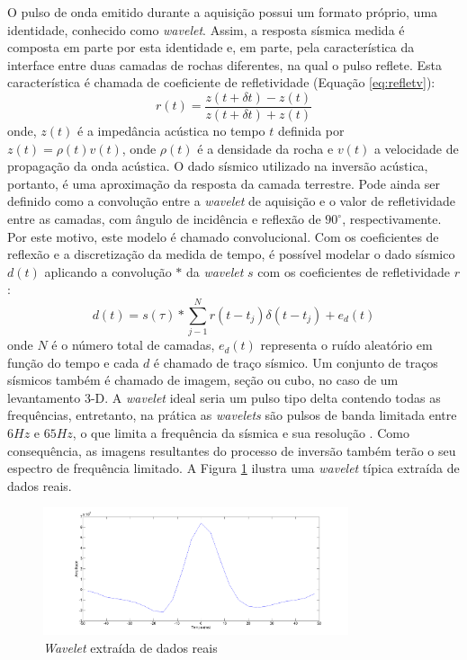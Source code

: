 O pulso de onda emitido durante a aquisição possui um formato próprio, uma identidade, 
conhecido como \textit{wavelet}. Assim, a resposta sísmica medida
é composta em parte por esta identidade e, em parte, pela característica da interface
entre duas camadas de rochas diferentes, na qual o pulso reflete.
Esta característica é chamada de coeficiente de refletividade (Equação \ref{eq:refletv}):
\begin{equation}
r(t) = \frac{z(t+\delta t)-z(t)}{z(t+\delta t)+z(t)}
\label{eq:refletv}
\end{equation}
onde, $z(t)$ é a impedância acústica no tempo $t$ definida por
$z(t)=\rho(t)v(t)$, onde $\rho(t)$ é a densidade da rocha e $v(t)$ a
velocidade de propagação da onda acústica.
O dado sísmico utilizado na inversão acústica, portanto,
é uma aproximação da resposta da camada terrestre. Pode ainda ser definido como
a convolução entre a \textit{wavelet} de aquisição e o valor de refletividade entre as
camadas, com ângulo de incidência e reflexão de $90^\circ$,
respectivamente. Por este motivo, este modelo é chamado convolucional.
Com os coeficientes de reflexão e a discretização da medida de tempo, é possível
modelar o dado sísmico $d(t)$ aplicando a convolução $*$
da \textit{wavelet} $s$ com os coeficientes de refletividade $r$:
\begin{equation}
d(t) = s(\tau) * \sum_{j-1}^{N}{r(t- t_j) \delta(t - t_j) + e_d(t)}
\end{equation}
onde $N$ é o número total de camadas, $e_d(t)$ representa o ruído aleatório em função do tempo
e cada $d$ é chamado de traço sísmico. Um conjunto de traços
sísmicos também é chamado de imagem, seção ou cubo, no caso de um
levantamento 3-D. A \textit{wavelet} ideal seria um pulso tipo delta contendo
todas as frequências, entretanto, na prática as
\textit{wavelets} são pulsos de banda limitada entre $6Hz$ e $65Hz$, o que
limita a frequência da sísmica e sua resolução \citep[p. 11]{sen_livro}.
Como consequência, as imagens resultantes do processo de inversão também terão
o seu espectro de frequência limitado. A Figura \ref{fig:wavelet} ilustra uma
\textit{wavelet} típica extraída de dados reais.
\begin{figure}[htp]
\begin{center}
  \includegraphics[width=0.8\textwidth]{fig/wavelet}
  \caption{\textit{Wavelet} extraída de dados reais}
  \label{fig:wavelet}
\end{center}
\end{figure}

